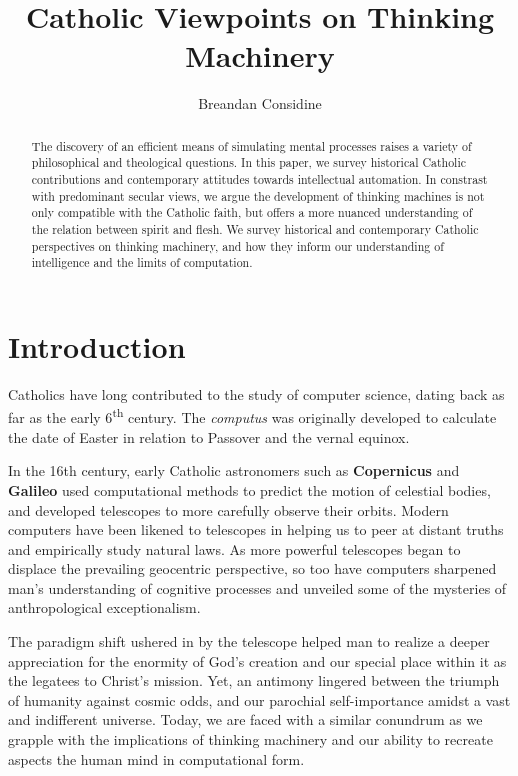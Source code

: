 \documentclass[sigplan,nonacm]{acmart}\settopmatter{printfolios=false,printccs=false,printacmref=false}
\begin{document}
  \title{Catholic Viewpoints on Thinking Machinery}
  \begin{abstract}
  The discovery of an efficient means of simulating mental processes raises a variety of philosophical and theological questions. In this paper, we survey historical Catholic contributions and contemporary attitudes towards intellectual automation. In constrast with predominant secular views, we argue the development of thinking machines is not only compatible with the Catholic faith, but offers a more nuanced understanding of the relation between spirit and flesh. We survey historical and contemporary Catholic perspectives on thinking machinery, and how they inform our understanding of intelligence and the limits of computation.
  \end{abstract}

  \author{Breandan Considine}

  \maketitle

  \section{Introduction}

  Catholics have long contributed to the study of computer science, dating back as far as the early 6\textsuperscript{th} century. The \textit{computus} was originally developed to calculate the date of Easter in relation to Passover and the vernal equinox.

  In the 16th century, early Catholic astronomers such as \textbf{Copernicus} and \textbf{Galileo} used computational methods to predict the motion of celestial bodies, and developed telescopes to more carefully observe their orbits. Modern computers have been likened to telescopes in helping us to peer at distant truths and empirically study natural laws. As more powerful telescopes began to displace the prevailing geocentric perspective, so too have computers sharpened man's understanding of cognitive processes and unveiled some of the mysteries of anthropological exceptionalism.

  The paradigm shift ushered in by the telescope helped man to realize a deeper appreciation for the enormity of God's creation and our special place within it as the legatees to Christ's mission. Yet, an antimony lingered between the triumph of humanity against cosmic odds, and our parochial self-importance amidst a vast and indifferent universe. Today, we are faced with a similar conundrum as we grapple with the implications of thinking machinery and our ability to recreate aspects the human mind in computational form.
\end{document}
